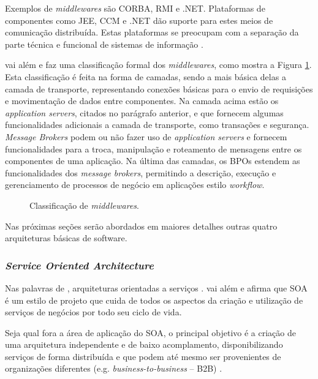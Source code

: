 \documentclass[diss]{template/setrem}
\begin{document}
Exemplos de \emph{middlewares} são CORBA, RMI e .NET. Plataformas de componentes como JEE, CCM e .NET dão suporte para estes meios de comunicação distribuída. Estas plataformas se preocupam com a separação da parte técnica e funcional de sistemas de informação \citep{Vogel2011}.

\citet{Gorton2011} vai além e faz uma classificação formal dos \emph{middlewares}, como mostra a Figura \ref{fig:middleware-classification}. Esta classificação é feita na forma de camadas, sendo a mais básica delas a camada de transporte, representando conexões básicas para o envio de requisições e movimentação de dados entre componentes. Na camada acima estão os \emph{application servers}, citados no parágrafo anterior, e que fornecem algumas funcionalidades adicionais a camada de transporte, como transações e segurança. \emph{Message Brokers} podem ou não fazer uso de \emph{application servers} e fornecem funcionalidades para a troca, manipulação e roteamento de mensagens entre os componentes de uma aplicação. Na última das camadas, os BPOs estendem as funcionalidades dos \emph{message brokers}, permitindo a descrição, execução e gerenciamento de processos de negócio em aplicações estilo \emph{workflow}.

\begin{figure}[!h]
    \caption{Classificação de \emph{middlewares}.}
    \label{fig:middleware-classification}
\end{figure}

Nas próximas seções serão abordados em maiores detalhes outras quatro arquiteturas básicas de software.

\subsubsection{\textit{Service Oriented Architecture}}
\label{subsubsec:soa}
Nas palavras de \citet[p. 206]{Vogel2011}, arquiteturas orientadas a serviços . \citet{Daigneau2010} vai além e afirma que SOA é um estilo de projeto que cuida de todos os aspectos da criação e utilização de serviços de negócios por todo seu ciclo de vida.

Seja qual fora a área de aplicação do SOA, o principal objetivo é a criação de uma arquitetura independente e de baixo acomplamento, disponibilizando serviços de forma distribuída e que podem até mesmo ser provenientes de organizações diferentes (e.g. \emph{business-to-business} -- B2B) \citep{Daigneau2010}.
\end{document}
